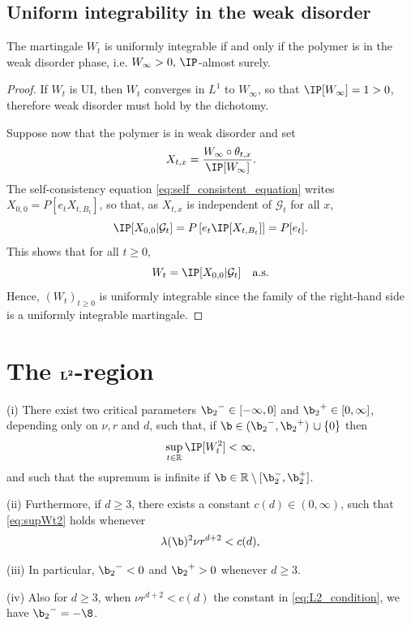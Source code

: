\subsection{Uniform integrability in the weak disorder}
\begin{proposition} \label{prop:UI}
The martingale $W_t$ is uniformly integrable if and only if the polymer is in the weak disorder phase, i.e. $W_\infty > 0,\, \IP$-almost surely.
\end{proposition}
\begin{proof}
If $W_t$ is UI, then $W_t$ converges in $L^1$ to $W_\infty$, so that $\IP[W_\infty] = 1 > 0$, therefore weak disorder must hold by the dichotomy.

Suppose now that the polymer is in weak disorder and set
\[X_{t,x} = \frac{W_\infty\circ \theta_{t,x}}{\IP [W_\infty]}.\]
The self-consistency equation \eqref{eq:self_consistent_equation} writes
$X_{0,0} = P[e_t X_{t,B_t}]$,
so that, as $X_{t,x}$ is independent of $\mathcal{G}_t$ for all $x$,
\[\IP[ X_{0,0} | \mathcal{G}_t] = P\left[e_t \IP[X_{t,B_t}]\right] = P[e_t].\]
This shows that for all $t\geq 0$, 
\[W_t = \IP[X_{0,0} | \mathcal{G}_t] \quad \text{a.s.}\]
Hence, $(W_t)_{t\geq 0}$ is uniformly integrable since the family of the right-hand side is a uniformly integrable martingale.
\end{proof}
















\section{The $\bf{L^2}$-region}
\begin{theorem} \label{th:LTwoRegion} (i) There exist two critical parameters ${\b_2}^- \in [-\infty,0]$ and ${\b_2}^+ \in [0,\infty]$, depending only on $\nu,r$ and $d$, such that, if $\b \in ({\b_2}^-,{\b_2}^+) \, \cup \{0\}$ then
\begin{equation}\label{eq:supWt2} \sup_{t\in\mathbb{R}} \IP [W_t^2] < \infty,
\end{equation} and such that the supremum is infinite if $\b \in \mathbb{R}\setminus [{\b}_2^-,\b_2^+]$.

(ii) Furthermore, if $d\geq 3$, there exists a constant $c(d)\in (0,\infty)$, such that \eqref{eq:supWt2} holds whenever
\begin{equation} \label{eq:L2_condition}
\lambda(\b)^2 \nu r^{d+2} < c(d),
\end{equation}

(iii) In particular, ${\b_2}^- < 0$ and ${\b_2}^+ > 0$ whenever $d\geq 3$.

(iv) Also for  $d\geq 3$, when $\nu r^{d+2} < c(d)$ the constant in \eqref{eq:L2_condition}, we have ${\b_2}^- =-\8$.
\end{theorem}

